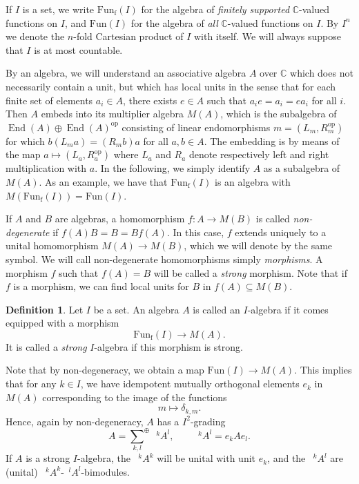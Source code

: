 \documentclass[12pt]{article}
\theoremstyle{change}
\DeclareMathOperator{\op}{\mathrm{op}}
\DeclareMathOperator{\fin}{\mathrm{f}}
\DeclareMathOperator{\End}{\mathrm{End}}
\newcommand{\C}{\mathbb{C}}
\newcommand{\Gru}[3]{\;{}^{\;#2}#1^{#3}}
\newcommand{\Fun}{\mathrm{Fun}}
\newcommand{\osum}[1]{\underset{#1}{\sum}^{\oplus}}
\theoremstyle{definition}
\newtheorem{Def}[Theorem]{Definition}
\numberwithin{equation}{section}
\begin{document}
If $I$ is a set, we write $\Fun_{\fin}(I)$ for the algebra of \emph{finitely supported} $\C$-valued functions on $I$, and $\Fun(I)$ for the algebra of \emph{all} $\C$-valued functions on $I$. By $I^n$ we denote the $n$-fold Cartesian product of $I$ with itself. We will always suppose that $I$ is at most countable.

By an algebra, we will understand an associative algebra $A$ over $\C$ which does not necessarily contain a unit, but which has local units in the sense that for each finite set of elements $a_i\in A$, there exists $e\in A$ such that $a_ie=a_i=ea_i$ for all $i$. Then $A$ embeds into its multiplier algebra $M(A)$, which is the subalgebra of $\End(A)\oplus \End(A)^{\op}$ consisting of linear endomorphisms $m = (L_m,R_m^{\op})$ for which $b(L_ma) = (R_mb)a$ for all $a,b\in A$. The embedding is by means of the map $a \mapsto (L_a,R_a^{\op})$ where $L_a$ and $R_a$ denote respectively left and right multiplication with $a$. In the following, we simply identify $A$ as a subalgebra of $M(A)$. As an example, we have that $\Fun_{\fin}(I)$ is an algebra with $M(\Fun_{\fin}(I)) = \Fun(I)$.

If $A$ and $B$ are algebras, a homomorphism $f:A\rightarrow M(B)$ is called \emph{non-degenerate} if $f(A)B = B = Bf(A)$. In this case, $f$ extends uniquely to a unital homomorphism $M(A)\rightarrow M(B)$, which we will denote by the same symbol. We will call non-degenerate homomorphisms simply \emph{morphisms}. A morphism $f$ such that $f(A)=B$ will be called a \emph{strong} morphism. Note that if $f$ is a morphism, we can find local units for $B$ in $f(A)\subseteq M(B)$.

\begin{Def} Let $I$ be a set. An algebra $A$ is called an $I$-algebra if it comes equipped with a morphism \[\Fun_{\fin}(I) \rightarrow M(A).\] It is called a \emph{strong} $I$-algebra if this morphism is strong.
\end{Def}

Note that by non-degeneracy, we obtain a map $\Fun(I)\rightarrow M(A)$. This implies that for any $k\in I$, we have idempotent mutually orthogonal elements $e_k$ in $M(A)$ corresponding to the image of the functions \[m \mapsto \delta_{k,m}.\] Hence, again by non-degeneracy, $A$ has a $I^{2}$-grading \[ A = \osum{k,l}\Gru{A}{k}{l}, \qquad  \Gru{A}{k}{l} =  e_kAe_l.\] If $A$ is a strong $I$-algebra, the $\Gru{A}{k}{k}$ will be unital with unit $e_k$, and the $\Gru{A}{k}{l}$ are (unital) $\Gru{A}{k}{k}$-$\Gru{A}{l}{l}$-bimodules.
\end{document}
